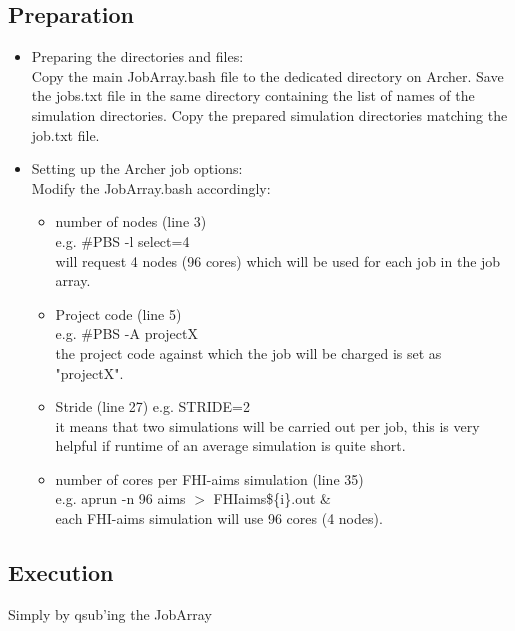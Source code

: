 \documentclass[12pt]{article}
\begin{document}
\subsection{Preparation}
\begin{itemize}
  \item Preparing the directories and files: \\
   Copy the main JobArray.bash file to the dedicated directory on Archer. Save the jobs.txt file in the same directory containing the list of names of the simulation directories. Copy the prepared simulation directories matching the job.txt file.
  
  \item Setting up the Archer job options: \\
  Modify the JobArray.bash accordingly:
  
  \begin{itemize}
  \item number of nodes (line 3) \\
  e.g. \#PBS -l select=4 \\
  will request 4 nodes (96 cores) which will be used for each job in the job array.
  
  \item Project code (line 5) \\
  e.g. \#PBS -A projectX
  \\ the project code against which the job will be charged is set as "projectX".
  
  \item Stride (line 27)
  e.g. STRIDE=2
  \\ it means that two simulations will be carried out per job, this is very helpful if runtime of an average simulation is quite short.
  
  \item number of cores per FHI-aims simulation (line 35) \\
  e.g. aprun -n 96 aims $>$ FHIaims\$\{i\}.out \&
  \\  each FHI-aims simulation will use 96 cores (4 nodes).  
  
  \end{itemize}
\end{itemize}

\subsection{Execution}

Simply by qsub'ing the JobArray%
\end{document}
